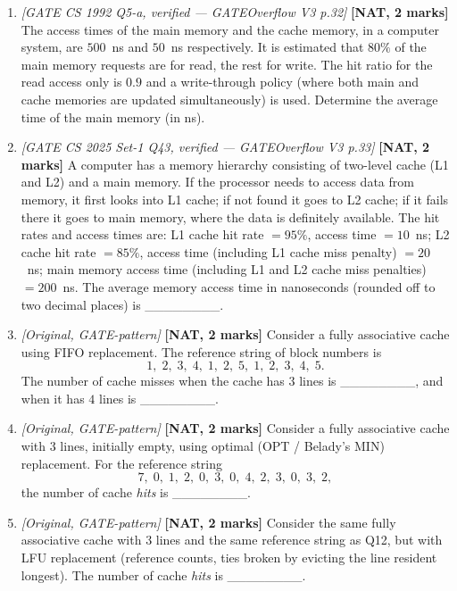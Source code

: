 \documentclass[11pt]{article}
\begin{document}
\begin{enumerate}
\item[\textbf{Q9}] \textit{[GATE CS 1992 Q5-a, verified --- GATEOverflow V3 p.32]} \textbf{[NAT, 2 marks]} The access times of the main memory and the cache memory, in a computer system, are $500$~ns and $50$~ns respectively. It is estimated that $80\%$ of the main memory requests are for read, the rest for write. The hit ratio for the read access only is $0.9$ and a write-through policy (where both main and cache memories are updated simultaneously) is used. Determine the average time of the main memory (in ns).

\item[\textbf{Q10}] \textit{[GATE CS 2025 Set-1 Q43, verified --- GATEOverflow V3 p.33]} \textbf{[NAT, 2 marks]} A computer has a memory hierarchy consisting of two-level cache (L1 and L2) and a main memory. If the processor needs to access data from memory, it first looks into L1 cache; if not found it goes to L2 cache; if it fails there it goes to main memory, where the data is definitely available. The hit rates and access times are: L1 cache hit rate $=95\%$, access time $=10$~ns; L2 cache hit rate $=85\%$, access time (including L1 cache miss penalty) $=20$~ns; main memory access time (including L1 and L2 cache miss penalties) $=200$~ns. The average memory access time in nanoseconds (rounded off to two decimal places) is \_\_\_\_\_\_\_\_.

\item[\textbf{Q11}] \textit{[Original, GATE-pattern]} \textbf{[NAT, 2 marks]} Consider a fully associative cache using FIFO replacement. The reference string of block numbers is
\[
1,\;2,\;3,\;4,\;1,\;2,\;5,\;1,\;2,\;3,\;4,\;5 .
\]
The number of cache misses when the cache has $3$ lines is \_\_\_\_\_\_\_\_, and when it has $4$ lines is \_\_\_\_\_\_\_\_.

\item[\textbf{Q12}] \textit{[Original, GATE-pattern]} \textbf{[NAT, 2 marks]} Consider a fully associative cache with $3$ lines, initially empty, using optimal (OPT / Belady's MIN) replacement. For the reference string
\[
7,\;0,\;1,\;2,\;0,\;3,\;0,\;4,\;2,\;3,\;0,\;3,\;2 ,
\]
the number of cache \emph{hits} is \_\_\_\_\_\_\_\_.

\item[\textbf{Q13}] \textit{[Original, GATE-pattern]} \textbf{[NAT, 2 marks]} Consider the same fully associative cache with $3$ lines and the same reference string as Q12, but with LFU replacement (reference counts, ties broken by evicting the line resident longest). The number of cache \emph{hits} is \_\_\_\_\_\_\_\_.
\end{enumerate}
\end{document}
